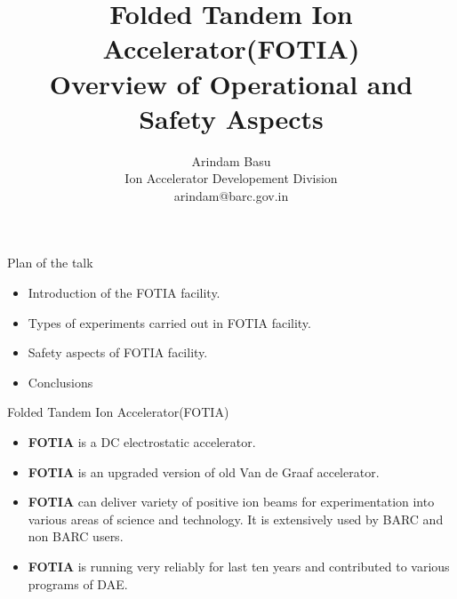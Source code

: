 \documentclass[11pt]{beamer}
\author{Arindam Basu \\ Ion Accelerator Developement Division\\ arindam@barc.gov.in}
\title{Folded Tandem Ion Accelerator(FOTIA)\\ Overview of Operational and Safety Aspects}
\institute{BARC}
\begin{document}
\begin{frame}
\titlepage
\end{frame}



\begin{frame}{Plan of the talk}

\begin{itemize}
\item Introduction of the FOTIA facility.
\item Types of experiments carried out in FOTIA facility.
\item Safety aspects of FOTIA facility.
\item Conclusions



\end{itemize}

\end{frame}





\begin{frame}{Folded Tandem Ion Accelerator(FOTIA)}

\begin{itemize}
\item \textbf{FOTIA} is a DC electrostatic accelerator.
\item \textbf{FOTIA} is an upgraded version of old Van de Graaf accelerator.
\item \textbf{FOTIA} can deliver variety of positive ion beams for experimentation into various areas of science and technology. It is extensively used by BARC and non BARC users.
\item \textbf{FOTIA} is running very reliably for last ten years and contributed to various programs of DAE.
 
\end{itemize}

\end{frame}
\end{document}
